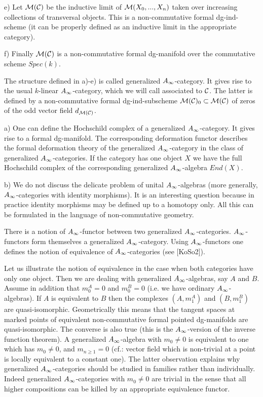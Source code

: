 \documentclass[a4paper,12pt]{article}
\begin{document}
e) Let  ${\cal M}({\cal C})$ be the inductive limit 
of ${\cal M}(X_0,...,X_n)$ taken over increasing collections
of transversal objects. This is a non-commutative formal dg-ind-scheme
(it can be properly defined as an inductive limit in the appropriate
category).

f) Finally  ${\cal M}({\cal C})$ is a non-commutative formal dg-manifold
over the commutative scheme $Spec(k)$. 

The  structure defined in a)-e)  is called generalized
$A_{\infty}$-category. It gives rise to the usual $k$-linear
$A_{\infty}$-category, which we will
call associated to ${\cal C}$. The latter is defined by
a non-commutative formal dg-ind-subscheme 
${\cal M}({\cal C})_0\subset {\cal M}({\cal C})$ of zeros
of the odd vector field $d_{{\cal M}({\cal C})}$.



\begin{rmk} a) One can define the Hochschild complex of
a generalized $A_{\infty}$-category. It gives rise to a 
formal dg-manifold. 
The corresponding deformation functor describes the formal deformation theory
of the generalized  $A_{\infty}$-category in the class of generalized $A_{\infty}$-categories.
If the category has one object $X$ we have 
the full Hochschild complex of the corresponding generalized
$A_{\infty}$-algebra $End(X)$.

b) We do not discuss  the delicate problem of unital $A_{\infty}$-algebras
(more generally, $A_{\infty}$-categories with identity morphisms). It is an interesting question because
in practice  identity morphisms may be defined  up to a homotopy only.
All this can be formulated in the language of non-commutative geometry.

\end{rmk}

There is a notion of $A_{\infty}$-functor between two generalized $A_{\infty}$-categories.
$A_{\infty}$-functors form themselves a generalized $A_{\infty}$-category.
Using $A_{\infty}$-functors one defines the notion of equivalence
of $A_{\infty}$-categories (see [KoSo2]).

Let us illustrate the  notion of equivalence in the case when
both categories have only one object.
Then we are dealing with generalized $A_{\infty}$-algebras, say $A$ and $B$.
Assume in addition that $m^A_0=0$ and $m_0^B=0$ (i.e. we have
ordinary $A_{\infty}$-algebras).
If $A$ is equivalent to $B$ then the complexes
$(A,m_1^A)$ and $(B,m_1^B)$ are quasi-isomorphic.
Geometrically this means that the tangent 
spaces at marked points 
of equivalent non-commutative formal pointed dg-manifolds
are quasi-isomorphic. The  converse is also true (this is the $A_{\infty}$-version of the
inverse function theorem). A generalized $A_{\infty}$-algebra with $m_0\ne 0$
is equivalent to one which has $m_0\ne 0$, and $m_{n\ge 1}=0$
(cf.: vector field which is non-trivial at a point
is locally equivalent to a constant one).
The latter observation explains 
why generalized $A_{\infty}$-categories should be studied
in families rather than individually. Indeed generalized $A_{\infty}$-categories
with $m_0\ne 0$ are trivial in the sense that all higher compositions
can be killed by an appropriate equivalence functor.
\end{document}
